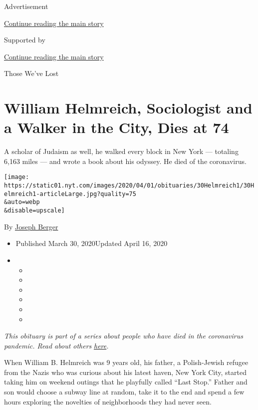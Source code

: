 Advertisement

\protect\hyperlink{after-top}{Continue reading the main story}

Supported by

\protect\hyperlink{after-sponsor}{Continue reading the main story}

Those We've Lost

\hypertarget{william-helmreich-sociologist-and-a-walker-in-the-city-dies-at-74}{%
\section{William Helmreich, Sociologist and a Walker in the City, Dies
at
74}\label{william-helmreich-sociologist-and-a-walker-in-the-city-dies-at-74}}

A scholar of Judaism as well, he walked every block in New York ---
totaling 6,163 miles --- and wrote a book about his odyssey. He died of
the coronavirus.

\texttt{[image: https://static01.nyt.com/images/2020/04/01/obituaries/30Helmreich1/30Helmreich1-articleLarge.jpg?quality=75\\\&auto=webp\\\&disable=upscale]}

By \href{https://www.nytimes.com/by/joseph-berger}{Joseph Berger}

\begin{itemize}
\item
  Published March 30, 2020Updated April 16, 2020
\item
  \begin{itemize}
  \item
  \item
  \item
  \item
  \item
  \item
  \end{itemize}
\end{itemize}

\emph{This obituary is part of a series about people who have died in
the coronavirus pandemic. Read about others}
\href{https://www.nytimes.com/series/people-who-have-died-of-the-coronavirus}{\emph{here}}\emph{.}

When William B. Helmreich was 9 years old, his father, a Polish-Jewish
refugee from the Nazis who was curious about his latest haven, New York
City, started taking him on weekend outings that he playfully called
``Last Stop.'' Father and son would choose a subway line at random, take
it to the end and spend a few hours exploring the novelties of
neighborhoods they had never seen.

